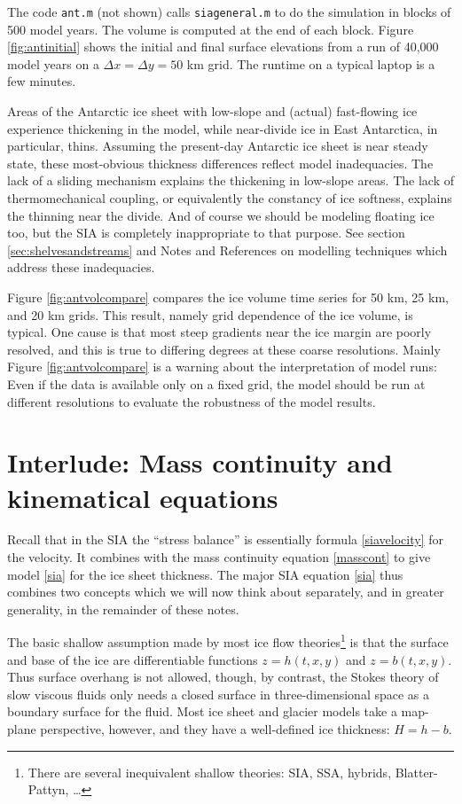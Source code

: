 \documentclass[letterpaper,final,12pt,reqno]{amsart}
\begin{document}
The code \texttt{ant.m} (not shown) calls \texttt{siageneral.m} to do the simulation in blocks of 500 model years.  The volume is computed at the end of each block.  Figure \ref{fig:antinitial} shows the initial and final surface elevations from a run of 40,000 model years on a $\Delta x = \Delta y = 50$ km grid.  The runtime on a typical laptop is a few minutes.

Areas of the Antarctic ice sheet with low-slope and (actual) fast-flowing ice experience thickening in the model, while near-divide ice in East Antarctica, in particular, thins.  Assuming the present-day Antarctic ice sheet is near steady state, these most-obvious thickness differences reflect model inadequacies.  The lack of a sliding mechanism explains the thickening in low-slope areas.  The lack of thermomechanical coupling, or equivalently the constancy of ice softness, explains the thinning near the divide.  And of course we should be modeling floating ice too, but the SIA is completely inappropriate to that purpose.  See section \ref{sec:shelvesandstreams} and Notes and References on modelling techniques which address these inadequacies.

Figure \ref{fig:antvolcompare} compares the ice volume time series for 50 km, 25 km, and 20 km grids.  This result, namely grid dependence of the ice volume, is typical.  One cause is that most steep gradients near the ice margin are poorly resolved, and this is true to differing degrees at these coarse resolutions.  Mainly Figure \ref{fig:antvolcompare} is a warning about the interpretation of model runs:  Even if the data is available only on a fixed grid, the model should be run at different resolutions to evaluate the robustness of the model results.


\section{Interlude: Mass continuity and kinematical equations}

Recall that in the SIA the ``stress balance'' is essentially formula \eqref{siavelocity} for the velocity.  It combines with the mass continuity equation \eqref{masscont} to give model \eqref{sia} for the ice sheet thickness.  The major SIA equation \eqref{sia} thus combines two concepts which we will now think about separately, and in greater generality, in the remainder of these notes.

The basic shallow assumption made by most ice flow theories\footnote{There are several inequivalent shallow theories: SIA, SSA, hybrids, Blatter-Pattyn, \dots} is that the surface and base of the ice are differentiable functions $z=h(t,x,y)$ and $z=b(t,x,y)$.  Thus surface overhang is not allowed, though, by contrast, the Stokes theory of slow viscous fluids only needs a closed surface in three-dimensional space as a boundary surface for the fluid.  Most ice sheet and glacier models take a map-plane perspective, however, and they have a well-defined ice thickness: $H=h-b$.
\end{document}
